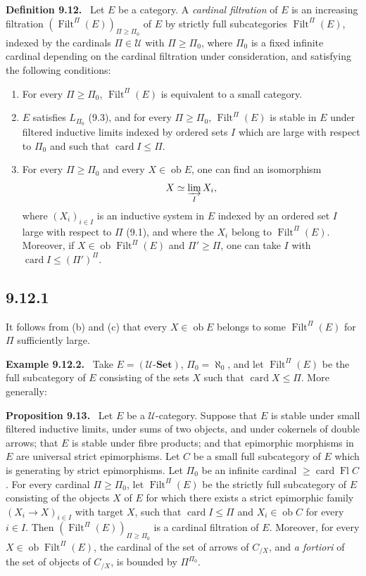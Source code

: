 \documentclass[11pt]{article}
\newcommand{\U}{\mathcal{U}}
\newcommand{\Set}{\mathbf{Set}}
\newcommand{\ob}{\operatorname{ob}}
\newcommand{\Filt}{\operatorname{Filt}}
\newcommand{\card}{\operatorname{card}}
\newcommand{\Fl}{\operatorname{Fl}}
\newenvironment{statement}[1]{\par\medskip\noindent\textbf{#1.}\ }{\par\medskip}
\newenvironment{remarktext}[1]{\par\medskip\noindent\textbf{#1.}\ }{\par\medskip}
\begin{document}
\begin{statement}{Definition 9.12}
Let $E$ be a category. A \emph{cardinal filtration} of $E$ is an increasing filtration $(\Filt^\Pi(E))_{\Pi\geq\Pi_0}$ of $E$ by strictly full subcategories $\Filt^\Pi(E)$, indexed by the cardinals $\Pi\in\U$ with $\Pi\geq\Pi_0$, where $\Pi_0$ is a fixed infinite cardinal depending on the cardinal filtration under consideration, and satisfying the following conditions:
\begin{enumerate}[label=\alph*)]
\item For every $\Pi\geq\Pi_0$, $\Filt^\Pi(E)$ is equivalent to a small category.

\item $E$ satisfies $L_{\Pi_0}$ (9.3), and for every $\Pi\geq\Pi_0$, $\Filt^\Pi(E)$ is stable in $E$ under filtered inductive limits indexed by ordered sets $I$ which are large with respect to $\Pi_0$ and such that $\card I\leq\Pi$.

\item For every $\Pi\geq\Pi_0$ and every $X\in\ob E$, one can find an isomorphism
\[
 X\simeq \varinjlim_I X_i,
\]
where $(X_i)_{i\in I}$ is an inductive system in $E$ indexed by an ordered set $I$ large with respect to $\Pi$ (9.1), and where the $X_i$ belong to $\Filt^\Pi(E)$. Moreover, if $X\in\ob\Filt^\Pi(E)$ and $\Pi'\geq\Pi$, one can take $I$ with $\card I\leq(\Pi')^\Pi$.
\end{enumerate}
\end{statement}

\subsection*{9.12.1}
It follows from (b) and (c) that every $X\in\ob E$ belongs to some $\Filt^\Pi(E)$ for $\Pi$ sufficiently large.

\begin{remarktext}{Example 9.12.2}
Take $E=(\U\text{-}\Set)$, $\Pi_0=\aleph_0$, and let $\Filt^\Pi(E)$ be the full subcategory of $E$ consisting of the sets $X$ such that $\card X\leq\Pi$. More generally:
\end{remarktext}

\begin{statement}{Proposition 9.13}
Let $E$ be a $\U$-category. Suppose that $E$ is stable under small filtered inductive limits, under sums of two objects, and under cokernels of double arrows; that $E$ is stable under fibre products; and that epimorphic morphisms in $E$ are universal strict epimorphisms. Let $C$ be a small full subcategory of $E$ which is generating by strict epimorphisms. Let $\Pi_0$ be an infinite cardinal $\geq\card\Fl C$. For every cardinal $\Pi\geq\Pi_0$, let $\Filt^\Pi(E)$ be the strictly full subcategory of $E$ consisting of the objects $X$ of $E$ for which there exists a strict epimorphic family $(X_i\to X)_{i\in I}$ with target $X$, such that $\card I\leq\Pi$ and $X_i\in\ob C$ for every $i\in I$. Then $(\Filt^\Pi(E))_{\Pi\geq\Pi_0}$ is a cardinal filtration of $E$. Moreover, for every $X\in\ob\Filt^\Pi(E)$, the cardinal of the set of arrows of $C_{/X}$, and \emph{a fortiori} of the set of objects of $C_{/X}$, is bounded by $\Pi^{\Pi_0}$.
\end{statement}
\end{document}
